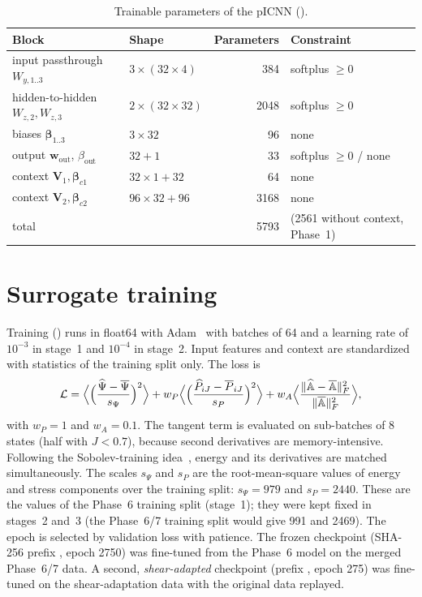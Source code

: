 \begin{table}[htbp]
\centering\small
\caption{Trainable parameters of the pICNN ().}
\label{tab:params}
\begin{tabular}{@{}llrl@{}}
\toprule
Block & Shape & Parameters & Constraint\\
\midrule
input passthrough $W_{y,1..3}$ & $3\times(32\times4)$ & 384 & softplus $\ge0$\\
hidden-to-hidden $W_{z,2},W_{z,3}$ & $2\times(32\times32)$ & 2048 & softplus $\ge0$\\
biases $\bm\beta_{1..3}$ & $3\times32$ & 96 & none\\
output $\bm w_{\mathrm{out}}$, $\beta_{\mathrm{out}}$ & $32+1$ & 33 & softplus $\ge0$ / none\\
context $\bm V_1,\bm\beta_{c1}$ & $32\times1+32$ & 64 & none\\
context $\bm V_2,\bm\beta_{c2}$ & $96\times32+96$ & 3168 & none\\
\midrule
total & & 5793 & (2561 without context, Phase~1)\\
\bottomrule
\end{tabular}
\end{table}

\section{Surrogate training}\label{sec:training}

Training () runs in float64 with Adam~\cite{Kingma2015}
with batches of 64 and a learning rate of $10^{-3}$ in stage~1 and $10^{-4}$ in stage~2.
Input features and context are standardized with
statistics of the training split only. The loss is
\begin{equation}
  \mathcal L=\Bigl\langle\Bigl(\frac{\widehat\Psi-\overline{\Psi}}{s_\Psi}\Bigr)^2\Bigr\rangle
  +w_P\Bigl\langle\Bigl(\frac{\widehat P_{iJ}-\overline P_{iJ}}{s_P}\Bigr)^2\Bigr\rangle
  +w_A\Bigl\langle\frac{\|\widehat{\mathbb A}-\overline{\mathbb A}\|_F^2}{\|\overline{\mathbb A}\|_F^2}\Bigr\rangle ,
  \label{eq:loss}
\end{equation}
with $w_P=1$ and $w_A=0.1$. The tangent term is evaluated on sub-batches of 8
states (half with $J<0.7$), because second derivatives are memory-intensive.
Following the Sobolev-training idea~\cite{Czarnecki2017}, energy and its
derivatives are matched simultaneously. The scales $s_\Psi$ and $s_P$ are the
root-mean-square values of energy and stress components over the training split:
$s_\Psi=979$ and $s_P=2440$. These are the values of the Phase~6 training split
(stage~1); they were kept fixed in stages~2 and~3 (the Phase~6/7 training split would give
991 and 2469). The epoch is selected by
validation loss with patience. The frozen checkpoint (SHA-256 prefix
, epoch 2750) was fine-tuned from the Phase~6 model on the merged
Phase~6/7 data. A second, \emph{shear-adapted} checkpoint (prefix
, epoch 275) was fine-tuned on the shear-adaptation data with the
original data replayed.

